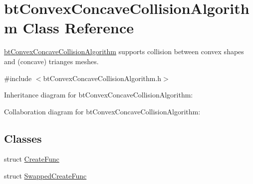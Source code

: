 \hypertarget{classbt_convex_concave_collision_algorithm}{\section{bt\+Convex\+Concave\+Collision\+Algorithm Class Reference}
\label{classbt_convex_concave_collision_algorithm}
}


\hyperlink{classbt_convex_concave_collision_algorithm}{bt\+Convex\+Concave\+Collision\+Algorithm} supports collision between convex shapes and (concave) trianges meshes.  




{\ttfamily \#include $<$bt\+Convex\+Concave\+Collision\+Algorithm.\+h$>$}



Inheritance diagram for bt\+Convex\+Concave\+Collision\+Algorithm\+:


Collaboration diagram for bt\+Convex\+Concave\+Collision\+Algorithm\+:
\subsection*{Classes}
\begin{DoxyCompactItemize}
\item 
struct \hyperlink{structbt_convex_concave_collision_algorithm_1_1_create_func}{Create\+Func}
\item 
struct \hyperlink{structbt_convex_concave_collision_algorithm_1_1_swapped_create_func}{Swapped\+Create\+Func}
\end{DoxyCompactItemize}
